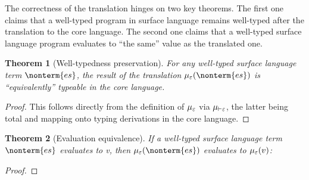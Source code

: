 \documentclass[a4paper]{article}
\newtheorem{theorem}{Theorem}
\begin{document}
The correctness of the translation hinges on two key theorems.
The first one claims that a well-typed program in surface language remains well-typed after the translation to the core language.
The second one claims that a well-typed surface language program evaluates to ``the same'' value as the translated one.

\begin{theorem}[Well-typedness preservation]
  For any well-typed surface language term $\nonterm{es}$,
  the result of the translation $\tranterm(\nonterm{es})$ is ``equivalently'' typeable in the core language.
\end{theorem}
\begin{proof}
  This follows directly from the definition of $\mu_\varepsilon$ via $\mu_{\vdash\varepsilon}$,
  the latter being total and mapping onto typing derivations in the core language.
\end{proof}

\begin{theorem}[Evaluation equivalence]
  If a well-typed surface language term $\nonterm{es}$ evaluates to v, then $\tranterm(\nonterm{es})$ evaluates to $\mu_\varepsilon(v)$:
\end{theorem}
\begin{proof}
\end{proof}



\end{document}
